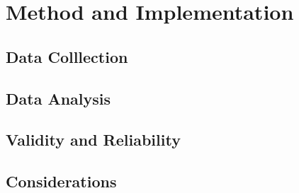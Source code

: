 \chapter{Method and Implementation}

\section{Data Colllection}

\section{Data Analysis}

\section{Validity and Reliability}

\section{Considerations}